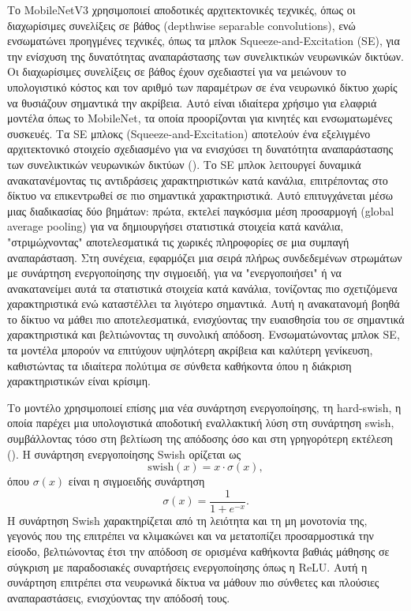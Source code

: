 Το MobileNetV3 χρησιμοποιεί αποδοτικές αρχιτεκτονικές τεχνικές, όπως οι διαχωρίσιμες συνελίξεις σε βάθος (depthwise separable convolutions), ενώ ενσωματώνει προηγμένες τεχνικές, όπως τα μπλοκ Squeeze-and-Excitation (SE), για την ενίσχυση της δυνατότητας αναπαράστασης των συνελικτικών νευρωνικών δικτύων. Οι διαχωρίσιμες συνελίξεις σε βάθος έχουν σχεδιαστεί για να μειώνουν το υπολογιστικό κόστος και τον αριθμό των παραμέτρων σε ένα νευρωνικό δίκτυο χωρίς να θυσιάζουν σημαντικά την ακρίβεια. Αυτό είναι ιδιαίτερα χρήσιμο για ελαφριά μοντέλα όπως το MobileNet, τα οποία προορίζονται για κινητές και ενσωματωμένες συσκευές. Τα SE μπλοκς (Squeeze-and-Excitation) αποτελούν ένα εξελιγμένο αρχιτεκτονικό στοιχείο σχεδιασμένο για να ενισχύσει τη δυνατότητα αναπαράστασης των συνελικτικών νευρωνικών δικτύων (). Το SE μπλοκ λειτουργεί δυναμικά ανακατανέμοντας τις αντιδράσεις χαρακτηριστικών κατά κανάλια, επιτρέποντας στο δίκτυο να επικεντρωθεί σε πιο σημαντικά χαρακτηριστικά. Αυτό επιτυγχάνεται μέσω μιας διαδικασίας δύο βημάτων: πρώτα, εκτελεί παγκόσμια μέση προσαρμογή (global average pooling) για να δημιουργήσει στατιστικά στοιχεία κατά κανάλια, "στριμώχνοντας" αποτελεσματικά τις χωρικές πληροφορίες σε μια συμπαγή αναπαράσταση. Στη συνέχεια, εφαρμόζει μια σειρά πλήρως συνδεδεμένων στρωμάτων με συνάρτηση ενεργοποίησης την σιγμοειδή, για να "ενεργοποιήσει" ή να ανακατανείμει αυτά τα στατιστικά στοιχεία κατά κανάλια, τονίζοντας πιο σχετιζόμενα χαρακτηριστικά ενώ καταστέλλει τα λιγότερο σημαντικά. Αυτή η ανακατανομή βοηθά το δίκτυο να μάθει πιο αποτελεσματικά, ενισχύοντας την ευαισθησία του σε σημαντικά χαρακτηριστικά και βελτιώνοντας τη συνολική απόδοση. Ενσωματώνοντας μπλοκ SE, τα μοντέλα μπορούν να επιτύχουν υψηλότερη ακρίβεια και καλύτερη γενίκευση, καθιστώντας τα ιδιαίτερα πολύτιμα σε σύνθετα καθήκοντα όπου η διάκριση χαρακτηριστικών είναι κρίσιμη.

Το μοντέλο χρησιμοποιεί επίσης μια νέα συνάρτηση ενεργοποίησης, τη hard-swish, η οποία παρέχει μια υπολογιστικά αποδοτική εναλλακτική λύση στη συνάρτηση swish, συμβάλλοντας τόσο στη βελτίωση της απόδοσης όσο και στη γρηγορότερη εκτέλεση (). Η συνάρτηση ενεργοποίησης Swish ορίζεται ως
\[
\text{swish}(x) = x \cdot \sigma(x),
\]
όπου \(\sigma(x)\) είναι η σιγμοειδής συνάρτηση
\[
\sigma(x) = \frac{1}{1 + e^{-x}}.
\]
Η συνάρτηση Swish χαρακτηρίζεται από τη λειότητα και τη μη μονοτονία της, γεγονός που της επιτρέπει να κλιμακώνει και να μετατοπίζει προσαρμοστικά την είσοδο, βελτιώνοντας έτσι την απόδοση σε ορισμένα καθήκοντα βαθιάς μάθησης σε σύγκριση με παραδοσιακές συναρτήσεις ενεργοποίησης όπως η ReLU. Αυτή η συνάρτηση επιτρέπει στα νευρωνικά δίκτυα να μάθουν πιο σύνθετες και πλούσιες αναπαραστάσεις, ενισχύοντας την απόδοσή τους.

